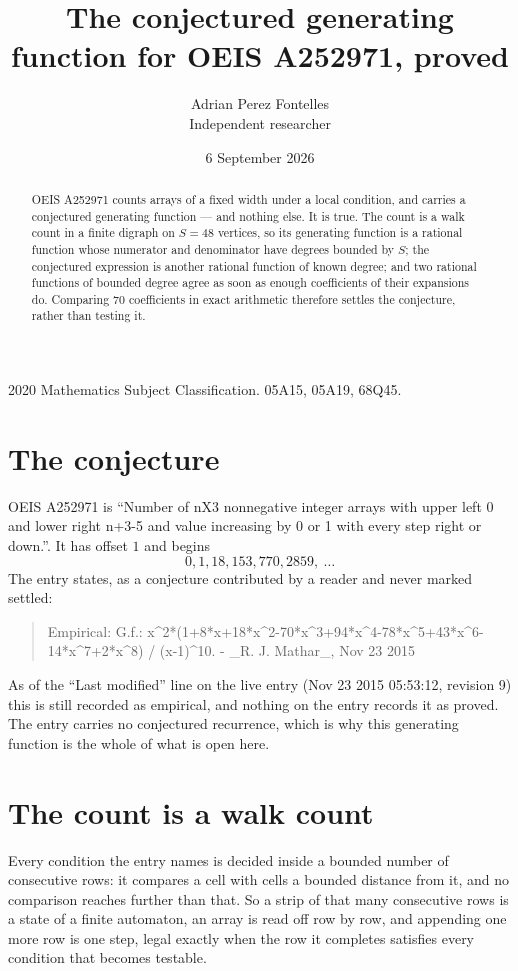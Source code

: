 \documentclass[11pt,a4paper]{article}
\title{The conjectured generating function for OEIS A252971, proved}
\author{Adrian Perez Fontelles\\ \small Independent researcher}
\date{6 September 2026}
\theoremstyle{plain}
\theoremstyle{definition}
\begin{document}
\maketitle

\begin{abstract}
OEIS A252971 counts arrays of a fixed width under a local condition, and carries a conjectured
generating function --- and nothing else. It is true. The count is a walk count in a finite
digraph on $S=48$ vertices, so its generating function is a rational function whose numerator
and denominator have degrees bounded by $S$; the conjectured expression is another rational
function of known degree; and two rational functions of bounded degree agree as soon as enough
coefficients of their expansions do. Comparing $70$ coefficients in exact arithmetic
therefore settles the conjecture, rather than testing it.
\end{abstract}

\noindent\small 2020 Mathematics Subject Classification. 05A15, 05A19, 68Q45.\normalsize

\section{The conjecture}

OEIS A252971 is ``Number of nX3 nonnegative integer arrays with upper left 0 and lower right n+3-5 and value increasing by 0 or 1 with every step right or down.''. It has offset $1$ and begins
\[
0, 1, 18, 153, 770, 2859,\ \dots
\]
The entry states, as a conjecture contributed by a reader and never marked settled:
\begin{quote}
Empirical: G.f.: x\^{}2*(1+8*x+18*x\^{}2-70*x\^{}3+94*x\^{}4-78*x\^{}5+43*x\^{}6-14*x\^{}7+2*x\^{}8) / (x-1)\^{}10. - \_R. J. Mathar\_, Nov 23 2015
\end{quote}
As of the ``Last modified'' line on the live entry (Nov 23 2015 05:53:12, revision 9) this is still
recorded as empirical, and nothing on the entry records it as proved. The entry carries no
conjectured recurrence, which is why this generating function is the whole of what is open
here.

\section{The count is a walk count}

Every condition the entry names is decided inside a bounded number of consecutive rows: it
compares a cell with cells a bounded distance from it, and no comparison reaches further than
that. So a strip of that many consecutive rows is a state of a finite automaton, an array is
read off row by row, and appending one more row is one step, legal exactly when the row it
completes satisfies every condition that becomes testable.
\end{document}
